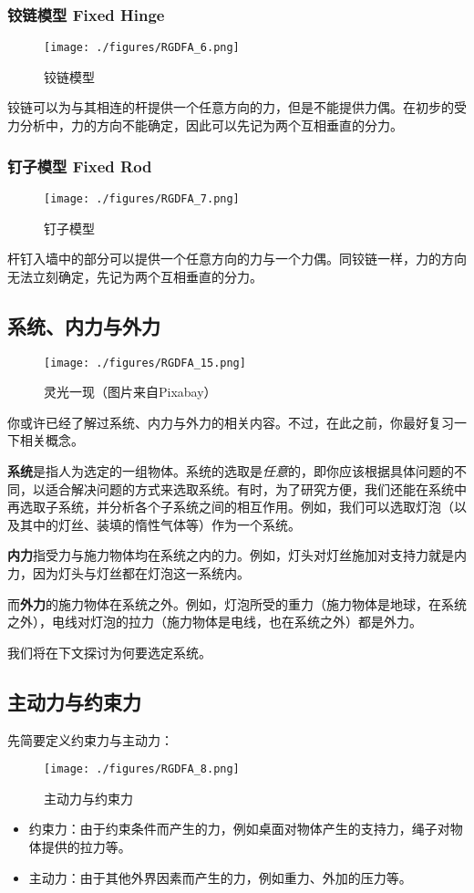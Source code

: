 \subsubsection{铰链模型 Fixed Hinge}
\begin{figure}[ht]
\centering
\texttt{[image: ./figures/RGDFA\_6.png]}
\caption{铰链模型} \label{RGDFA_fig6}
\end{figure}
铰链可以为与其相连的杆提供一个任意方向的力，但是不能提供力偶。在初步的受力分析中，力的方向不能确定，因此可以先记为两个互相垂直的分力。
\subsubsection{钉子模型 Fixed Rod}
\begin{figure}[ht]
\centering
\texttt{[image: ./figures/RGDFA\_7.png]}
\caption{钉子模型} \label{RGDFA_fig7}
\end{figure}
杆钉入墙中的部分可以提供一个任意方向的力与一个力偶。同铰链一样，力的方向无法立刻确定，先记为两个互相垂直的分力。

\subsection{系统、内力与外力}
\begin{figure}[ht]
\centering
\texttt{[image: ./figures/RGDFA\_15.png]}
\caption{灵光一现（图片来自Pixabay）} \label{RGDFA_fig15}
\end{figure}

你或许已经了解过系统、内力与外力的相关内容。不过，在此之前，你最好复习一下相关概念。

\textbf{系统}是指人为选定的一组物体。系统的选取是\textsl{任意}的，即你应该根据具体问题的不同，以适合解决问题的方式来选取系统。有时，为了研究方便，我们还能在系统中再选取子系统，并分析各个子系统之间的相互作用。例如，我们可以选取灯泡（以及其中的灯丝、装填的惰性气体等）作为一个系统。

\textbf{内力}指受力与施力物体均在系统之内的力。例如，灯头对灯丝施加对支持力就是内力，因为灯头与灯丝都在灯泡这一系统内。

而\textbf{外力}的施力物体在系统之外。例如，灯泡所受的重力（施力物体是地球，在系统之外），电线对灯泡的拉力（施力物体是电线，也在系统之外）都是外力。

我们将在下文探讨为何要选定系统。

\subsection{主动力与约束力}
先简要定义约束力与主动力：
\begin{figure}[ht]
\centering
\texttt{[image: ./figures/RGDFA\_8.png]}
\caption{主动力与约束力} \label{RGDFA_fig8}
\end{figure}
\begin{itemize}
\item 约束力：由于约束条件而产生的力，例如桌面对物体产生的支持力，绳子对物体提供的拉力等。
\item 主动力：由于其他外界因素而产生的力，例如重力、外加的压力等。
\end{itemize}

